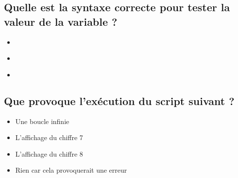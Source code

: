 \documentclass[11pt,a4paper]{article}
\begin{document}
\newpage

\MakeStudentName

\subsection{Quelle est la syntaxe correcte pour tester la valeur de la variable  ?}

\begin{itemize}
\item[\CaseCoche]  \\
\item[\CaseCoche]  \\
\item[\CaseCoche]  \\
\end{itemize}


\subsection{Que provoque l'exécution du script suivant ?}


\bigskip

\begin{itemize}
\item[\CaseCoche] Une boucle infinie \\
\item[\CaseCoche] L'affichage du chiffre 7 \\
\item[\CaseCoche] L'affichage du chiffre 8 \\
\item[\CaseCoche] Rien car cela provoquerait une erreur \\
\end{itemize}
\end{document}
